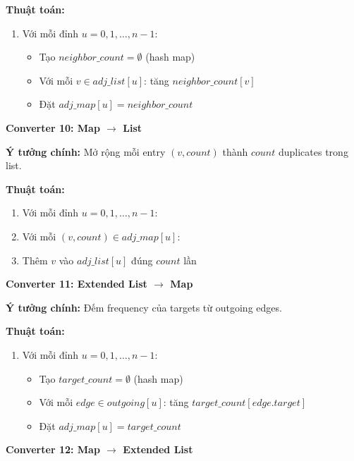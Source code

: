 \documentclass[12pt,a4paper]{article}
\begin{document}
\textbf{Thuật toán:}
\begin{enumerate}
    \item Với mỗi đỉnh $u = 0, 1, \ldots, n-1$:
    \begin{itemize}
        \item Tạo $neighbor\_count = \emptyset$ (hash map)
        \item Với mỗi $v \in adj\_list[u]$: tăng $neighbor\_count[v]$
        \item Đặt $adj\_map[u] = neighbor\_count$
    \end{itemize}
\end{enumerate}

\vspace{0.5cm}

\textbf{Converter 10: Map $\rightarrow$ List}

\textbf{Ý tưởng chính:} Mở rộng mỗi entry $(v, count)$ thành $count$ duplicates trong list.

\textbf{Thuật toán:}
\begin{enumerate}
    \item Với mỗi đỉnh $u = 0, 1, \ldots, n-1$:
    \item Với mỗi $(v, count) \in adj\_map[u]$:
    \item Thêm $v$ vào $adj\_list[u]$ đúng $count$ lần
\end{enumerate}

\vspace{0.5cm}

\textbf{Converter 11: Extended List $\rightarrow$ Map}

\textbf{Ý tưởng chính:} Đếm frequency của targets từ outgoing edges.

\textbf{Thuật toán:}
\begin{enumerate}
    \item Với mỗi đỉnh $u = 0, 1, \ldots, n-1$:
    \begin{itemize}
        \item Tạo $target\_count = \emptyset$ (hash map)
        \item Với mỗi $edge \in outgoing[u]$: tăng $target\_count[edge.target]$
        \item Đặt $adj\_map[u] = target\_count$
    \end{itemize}
\end{enumerate}

\vspace{0.5cm}

\textbf{Converter 12: Map $\rightarrow$ Extended List}
\end{document}
